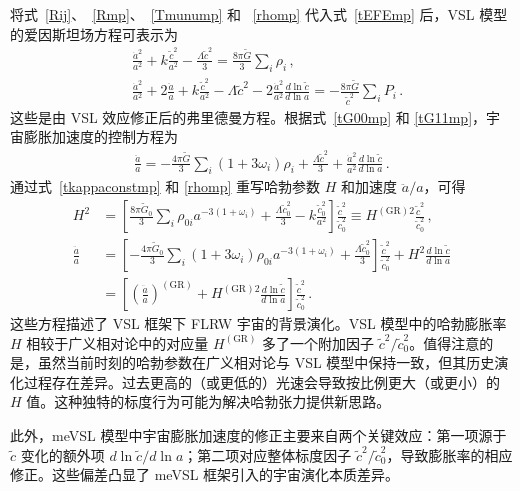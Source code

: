 \documentclass[jkps,preprint,fleqn]{revtex4}
\newcommand{\tc}{\tilde{c}}
\newcommand{\tG}{\tilde{G}}
\newcommand{\GR}{\text{GR}}
\begin{document}
将式~\eqref{Rij}、~\eqref{Rmp}、~\eqref{Tmunump} 和 ~\eqref{rhomp} 代入式~\eqref{tEFEmp} 后，VSL 模型的爱因斯坦场方程可表示为
\begin{align}
 &\frac{\dot{a}^2}{a^2} + k \frac{\tc^2}{a^2}  -\frac{ \Lambda \tc^2}{3} = \frac{8 \pi \tG}{3} \sum_i \rho_i \label{tG00mp} \,, \\
 &\frac{\dot{a}^2}{a^2} + 2 \frac{\ddot{a}}{a} +  k \frac{\tc^2}{a^2} - \Lambda \tc^2 - 2 \frac{\dot{a}^2}{a^2} \frac{d \ln \tc}{d \ln a} = -\frac{8 \pi \tG}{\tc^2} \sum_{i} P_i  \label{tG11mp} \,.
 \end{align}
这些是由 VSL 效应修正后的弗里德曼方程。根据式~\eqref{tG00mp} 和 \eqref{tG11mp}，宇宙膨胀加速度的控制方程为
\begin{align}
 \frac{\ddot{a}}{a} = -\frac{4\pi \tG}{3} \sum_i \left( 1 + 3 \omega_i \right) \rho_i  + \frac{\Lambda \tc^2}{3} + \frac{\dot{a}^2}{a^2} \frac{d \ln \tc}{d \ln a} \label{t3G11mG00mp} \,.
 \end{align}
通过式~\eqref{tkappaconstmp} 和 \eqref{rhomp} 重写哈勃参数 $H$ 和加速度 $\ddot{a}/a$，可得
\begin{align}
 H^2 &= \left[ \frac{8 \pi \tG_0}{3} \sum_{i} \rho_{0i} a^{-3(1+\omega_i)} + \frac{ \Lambda \tc_0^2}{3} - k \frac{\tc_0^2}{a^2} \right] \frac{\tc^2}{\tc_0^2} \equiv H^{(\GR)2} \frac{\tc^2}{\tc_0^2} \label{H2me} \,, \\
 \frac{\ddot{a}}{a} &= \left[ -\frac{4\pi \tG_0}{3} \sum_i \left( 1 + 3 \omega_i \right) \rho_{0i} a^{-3(1+\omega_i)} + \frac{\Lambda \tc_0^2}{3} \right] \frac{\tc^2}{\tc_0^2} + H^2 \frac{d \ln \tc}{d \ln a} \nonumber \\
 &= \left[ \left( \frac{\ddot{a}}{a} \right)^{(\GR)} +  H^{(\GR)2} \frac{d \ln \tc}{d \ln a}  \right] \frac{\tc^2}{\tc_0^2} \label{ddotaoa} \,.
 \end{align}
这些方程描述了 VSL 框架下 FLRW 宇宙的背景演化。VSL 模型中的哈勃膨胀率 $H$ 相较于广义相对论中的对应量 $H^{(\GR)}$ 多了一个附加因子 $\tc^2/\tc_0^2$。值得注意的是，虽然当前时刻的哈勃参数在广义相对论与 VSL 模型中保持一致，但其历史演化过程存在差异。过去更高的（或更低的）光速会导致按比例更大（或更小）的 $H$ 值。这种独特的标度行为可能为解决哈勃张力提供新思路。

此外，meVSL 模型中宇宙膨胀加速度的修正主要来自两个关键效应：第一项源于 $\tc$ 变化的额外项 $d \ln \tc/d \ln a$；第二项对应整体标度因子 $\tc^2/\tc_0^2$，导致膨胀率的相应修正。这些偏差凸显了 meVSL 框架引入的宇宙演化本质差异。
\end{document}
